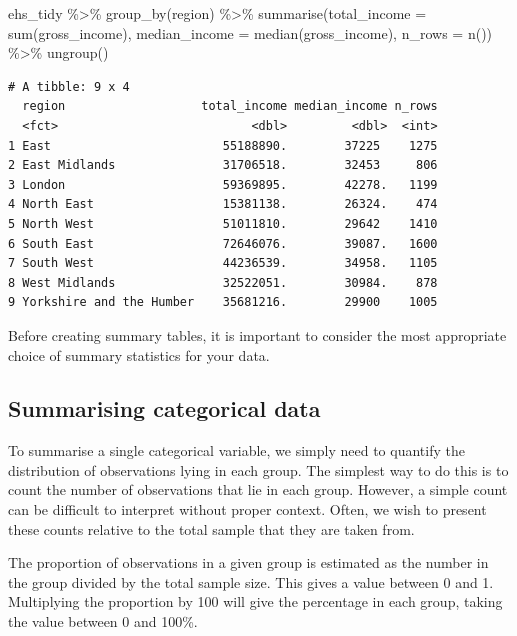 \documentclass[
  letterpaper,
  DIV=11,
  numbers=noendperiod]{scrreprt}
\newenvironment{Shaded}{\begin{snugshade}}{\end{snugshade}}
\newcommand{\AttributeTok}[1]{\textcolor[rgb]{0.40,0.45,0.13}{#1}}
\newcommand{\FunctionTok}[1]{\textcolor[rgb]{0.28,0.35,0.67}{#1}}
\newcommand{\NormalTok}[1]{\textcolor[rgb]{0.00,0.23,0.31}{#1}}
\newcommand{\SpecialCharTok}[1]{\textcolor[rgb]{0.37,0.37,0.37}{#1}}
\begin{document}
\begin{Shaded}
\begin{Highlighting}[]
\NormalTok{ehs\_tidy }\SpecialCharTok{\%\textgreater{}\%} 
  \FunctionTok{group\_by}\NormalTok{(region) }\SpecialCharTok{\%\textgreater{}\%} 
  \FunctionTok{summarise}\NormalTok{(}\AttributeTok{total\_income =} \FunctionTok{sum}\NormalTok{(gross\_income),}
            \AttributeTok{median\_income =} \FunctionTok{median}\NormalTok{(gross\_income),}
            \AttributeTok{n\_rows =} \FunctionTok{n}\NormalTok{()) }\SpecialCharTok{\%\textgreater{}\%} 
  \FunctionTok{ungroup}\NormalTok{()}
\end{Highlighting}
\end{Shaded}

\begin{verbatim}
# A tibble: 9 x 4
  region                   total_income median_income n_rows
  <fct>                           <dbl>         <dbl>  <int>
1 East                        55188890.        37225    1275
2 East Midlands               31706518.        32453     806
3 London                      59369895.        42278.   1199
4 North East                  15381138.        26324.    474
5 North West                  51011810.        29642    1410
6 South East                  72646076.        39087.   1600
7 South West                  44236539.        34958.   1105
8 West Midlands               32522051.        30984.    878
9 Yorkshire and the Humber    35681216.        29900    1005
\end{verbatim}

Before creating summary tables, it is important to consider the most
appropriate choice of summary statistics for your data.

\subsection{Summarising categorical
data}\label{summarising-categorical-data}

To summarise a single categorical variable, we simply need to quantify
the distribution of observations lying in each group. The simplest way
to do this is to count the number of observations that lie in each
group. However, a simple count can be difficult to interpret without
proper context. Often, we wish to present these counts relative to the
total sample that they are taken from.

The proportion of observations in a given group is estimated as the
number in the group divided by the total sample size. This gives a value
between 0 and 1. Multiplying the proportion by 100 will give the
percentage in each group, taking the value between 0 and 100\%.
\end{document}
